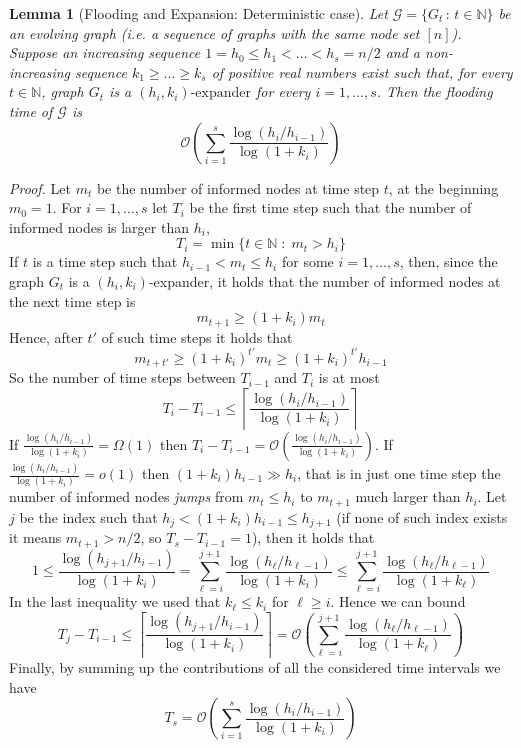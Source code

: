 \documentclass[10pt,a4paper]{article}
\newtheorem{lemma}[definition]{Lemma}
\newcommand{\proof}{\noindent\textit{Proof. }}
\begin{document}
\begin{lemma}[Flooding and Expansion: Deterministic case]\label{lemma:detbig}
Let $\mathcal{G} = \{ G_t \,:\, t \in \mathbb{N} \}$ be an evolving graph (i.e. a sequence of graphs with the same node set $[n]$). Suppose an increasing sequence $1 = h_0 \leqslant h_1 < \dots < h_s = n/2$ and a non-increasing sequence $k_1 \geqslant  \dots \geqslant k_s$ of positive real numbers exist such that, for every $t \in \mathbb{N}$, graph $G_t$ is a $(h_i,k_i)\mbox{-expander}$ for every $i=1, \dots, s$. Then the flooding time of $\mathcal{G}$ is
$$
\mathcal{O}\left( \sum_{i=1}^s \frac{\log (h_i/h_{i-1})}{\log (1 + k_i)} \right)
$$
\end{lemma}
\proof Let $m_t$ be the number of informed nodes at time step $t$, at the beginning $m_0 = 1$. For $i = 1, \dots, s$ let $T_i$ be the first time step such that the number of informed nodes is larger than $h_i$,
$$
T_i = \min \{ t \in \mathbb{N} \;:\; m_t > h_i \}
$$
If $t$ is a time step such that $h_{i-1} < m_t \leqslant h_i$ for some $i = 1, \dots, s$, then, since the graph $G_t$ is a $(h_i, k_i)$-expander, it holds that the number of informed nodes at the next time step is
$$
m_{t+1} \geqslant (1 + k_i) m_t
$$
Hence, after $t'$ of such time steps it holds that
$$
m_{t+t'} \geqslant (1 + k_i)^{t'} m_t \geqslant (1 + k_i)^{t'} h_{i-1}
$$
So the number of time steps between $T_{i-1}$ and $T_i$ is at most
$$
T_i - T_{i-1} \leqslant \left\lceil \frac{\log(h_i/h_{i-1})}{\log(1 + k_i)} \right\rceil
$$
If $\frac{\log(h_i/h_{i-1})}{\log(1 + k_i)} = \Omega(1)$ then $T_i - T_{i-1} = \mathcal{O}\left( \frac{\log(h_i/h_{i-1})}{\log(1 + k_i)} \right)$. If $\frac{\log(h_i/h_{i-1})}{\log(1 + k_i)} = o(1)$ then $(1+k_i)h_{i-1} \gg h_i$, that is in just one time step the number of informed nodes \emph{jumps} from $m_t \leqslant h_i$ to $m_{t+1}$ much larger than $h_i$. Let $j$ be the index such that $h_j < (1+k_i)h_{i-1} \leqslant h_{j+1}$ (if none of such index exists it means $m_{t+1} > n/2$, so $T_s - T_{i-1} = 1$), then it holds that
$$
1 \leqslant \frac{\log(h_{j+1}/h_{i-1})}{\log(1 + k_i)} = \sum_{\ell = i}^{j+1} \frac{\log(h_\ell/h_{\ell-1})}{\log(1 + k_i)} \leqslant \sum_{\ell = i}^{j+1} \frac{\log(h_\ell/h_{\ell-1})}{\log(1 + k_\ell)}
$$
In the last inequality we used that $k_\ell \leqslant k_i$ for $\ell \geqslant i$. Hence we can bound 
$$
T_j - T_{i-1} \leqslant \left\lceil \frac{\log(h_{j+1}/h_{i-1})}{\log(1 + k_i)} \right\rceil
= \mathcal{O}\left( \sum_{\ell = i}^{j+1} \frac{\log(h_\ell/h_{\ell-1})}{\log(1 + k_\ell)} \right)
$$
Finally, by summing up the contributions of all the considered time intervals we have
$$
T_s = \mathcal{O}\left( \sum_{i=1}^s \frac{\log (h_i/h_{i-1})}{\log (1 + k_i)} \right)
$$
\end{document}
